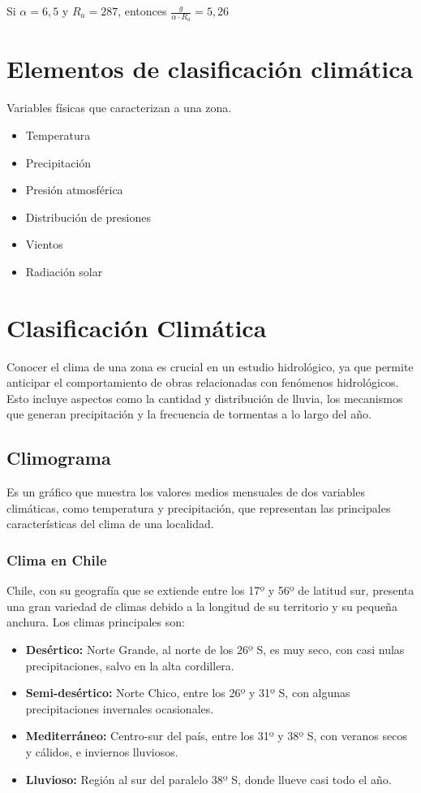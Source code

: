Si $\alpha = 6,5$ y $R_a = 287$, entonces $\frac{g}{\alpha \cdot R_a} = 5,26$

\section{Elementos de clasificación climática}

Variables físicas que caracterizan a una zona.
\begin{itemize}
    \item Temperatura
    \item Precipitación
    \item Presión atmosférica
    \item Distribución de presiones 
    \item Vientos
    \item Radiación solar
\end{itemize}

\section{Clasificación Climática}
Conocer el clima de una zona es crucial en un estudio hidrológico, ya que permite anticipar el comportamiento de obras relacionadas con fenómenos hidrológicos. Esto incluye aspectos como la cantidad y distribución de lluvia, los mecanismos que generan precipitación y la frecuencia de tormentas a lo largo del año.

\subsection{Climograma}
Es un gráfico que muestra los valores medios mensuales de dos variables climáticas, como temperatura y precipitación, que representan las principales características del clima de una localidad.

\subsubsection{Clima en Chile}

Chile, con su geografía que se extiende entre los 17º y 56º de latitud sur, presenta una gran variedad de climas debido a la longitud de su territorio y su pequeña anchura. Los climas principales son:

\begin{itemize}
    \item \textbf{Desértico:} Norte Grande, al norte de los 26º S, es muy seco, con casi nulas precipitaciones, salvo en la alta cordillera.
    \item \textbf{Semi-desértico:} Norte Chico, entre los 26º y 31º S, con algunas precipitaciones invernales ocasionales.
    \item \textbf{Mediterráneo:} Centro-sur del país, entre los 31º y 38º S, con veranos secos y cálidos, e inviernos lluviosos.
    \item \textbf{Lluvioso:} Región al sur del paralelo 38º S, donde llueve casi todo el año.
\end{itemize}

